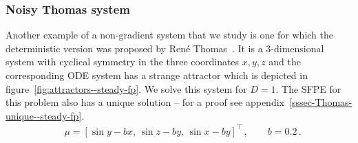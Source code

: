 \subsubsection{Noisy Thomas system}
Another example of a non-gradient system that we study is one for which the deterministic version was proposed by René Thomas~\cite{thomas1999deterministic}. It is a 3-dimensional system with cyclical symmetry in the three coordinates $x, y, z$ and the corresponding ODE system has a strange attractor which is depicted in figure~\ref{fig:attractors--steady-fp}.
We solve this system for $D=1$. The SFPE for this problem also has a unique solution -- for a proof see appendix~\ref{sssec-Thomas-unique--steady-fp}.
\begin{align}
    &\mu=[\sin y - bx,\, \sin z - by,\, \sin x - by ]^\top \,, \qquad b =  0.2 \,. \label{eq:mu-Thomas--steady-fp} 
\end{align}


